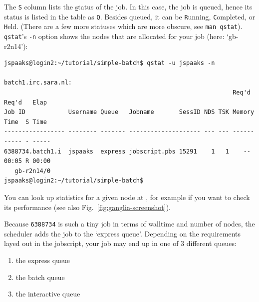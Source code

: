 The \lstinline[style=bashinline]{S} column lists the \underline{s}tatus of the job. In this case, the job is queued, hence its status is listed in the table as \lstinline[style=bashinline]{Q}. Besides queued, it can be \lstinline[style=bashinline]{R}unning, \lstinline[style=bashinline]{C}ompleted, or \lstinline[style=bashinline]{H}eld. (There are a few more statuses which are more obscure, see \lstinline[style=bashinline]{man qstat}). \lstinline[style=bashinline]{qstat}'s \lstinline[style=bashinline]{-n} option shows the nodes that are allocated for your job (here: `gb-r2n14'):%

\begin{lstlisting}[style=basic,style=bash]
jspaaks@login2:~/tutorial/simple-batch$ qstat -u jspaaks -n

batch1.irc.sara.nl:
                                                                Req'd  Req'd   Elap
Job ID            Username Queue   Jobname       SessID NDS TSK Memory Time  S Time
----------------- -------- ------- -------------------- --- --- ------ ----- - -----
6388734.batch1.i  jspaaks  express jobscript.pbs 15291    1   1    --  00:05 R 00:00
   gb-r2n14/0
jspaaks@login2:~/tutorial/simple-batch$
\end{lstlisting}
You can look up statistics for a given node at  , for example if you want to check its performance (see also Fig.~\ref{fig:ganglia-screenshot}).

Because \lstinline[style=bashinline]{6388734} is such a tiny job in terms of walltime and number of nodes, the scheduler adds the job to the `express queue'. Depending on the requirements layed out in the jobscript, your job may end up in one of 3 different queues:
\begin{enumerate}
\item{the express queue}
\item{the batch queue}
\item{the interactive queue}
\end{enumerate}

